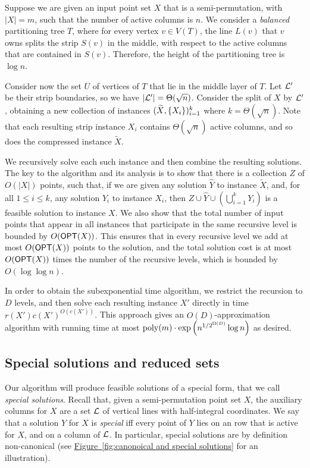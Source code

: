 \documentclass[11pt]{article}
\numberwithin{equation}{section}
\theoremstyle{definition}
\theoremstyle{plain}
\newcommand{\expref}[2]{\hyperref[#2]{#1~\ref{#2}}}
\begin{document}
Suppose we are given an input point set $X$ that is a semi-permutation, with $|X|=m$, such that the number of active columns is $n$. We consider a \emph{balanced} partitioning tree $T$, where for every vertex $v\in V(T)$, the line $L(v)$ that $v$ owns splits the strip $S(v)$ in the middle, with respect to the active columns that are contained in $S(v)$. Therefore, the height of the partitioning tree is $\log n$.

Consider now the set $U$ of vertices of $T$ that lie in the middle layer of $T$. Let ${\mathcal L}'$ be their strip boundaries, so we have $|{\mathcal L}'| = \Theta(\sqrt{n})$. Consider the split of $X$ by ${\mathcal L}'$,  obtaining a new collection of instances $(\widetilde{X}, \left\{ X_i \right\})_{i=1}^k$ where $k = \Theta(\sqrt{n})$. Note that each resulting strip instance $X_i$ contains $\Theta(\sqrt{n})$ active columns, and so does the compressed instance $\widetilde{X}$.
 
We recursively solve each such instance and then  combine the resulting solutions.
The key to the algorithm and its analysis is to show that there is a collection $Z$ of $O(|X|)$ points, such that, if we are given any  solution $\widehat{Y}$ to instance $\widetilde{X}$, and, for all $1\leq i\leq k$, any  solution $Y_i$ to instance $X_i$, then $Z\cup \widehat{Y}\cup \left(\bigcup_{i=1}^k Y_i\right) $ is a feasible solution to instance $X$. We also show that the total number of input points that appear in all instances that participate in the same recursive level is bounded by $O(\mbox{\sf OPT}(X))$. This ensures that in every recursive level we add at most $O(\mbox{\sf OPT}(X))$ points to the solution, and the total solution cost is at most $O(\mbox{\sf OPT}(X))$ times the number of the recursive levels, which is bounded by $O(\log\log n)$.

In order to obtain the subexponential time algorithm, we restrict the recursion to $D$ levels, and then solve each resulting instance $X'$ directly in time $r(X') c(X')^{O(c(X'))}$. %
This approach gives an $O(D)$-approximation algorithm with running time at most  $\operatorname{poly}(m)\cdot \exp\left ( n^{1/2^{\Omega(D)}} \log n \right )$ as desired. 
%
%

%
%
%
%

\subsection{Special solutions and reduced sets} %

Our algorithm will produce feasible solutions of a special form, that we call \emph{special solutions}. Recall that, given a semi-permutation point set $X$, the auxiliary columns for $X$ are a set ${\mathcal L}$ of vertical lines with half-integral coordinates. We say that a solution $Y$ for $X$ is \emph{special} iff every point of $Y$ lies on an row that is active for $X$, and on a column of ${\mathcal L}$. In particular, special solutions are by definition non-canonical (see \expref{Figure}{fig:canonoical and special solutions} for an illustration).  
\end{document}
